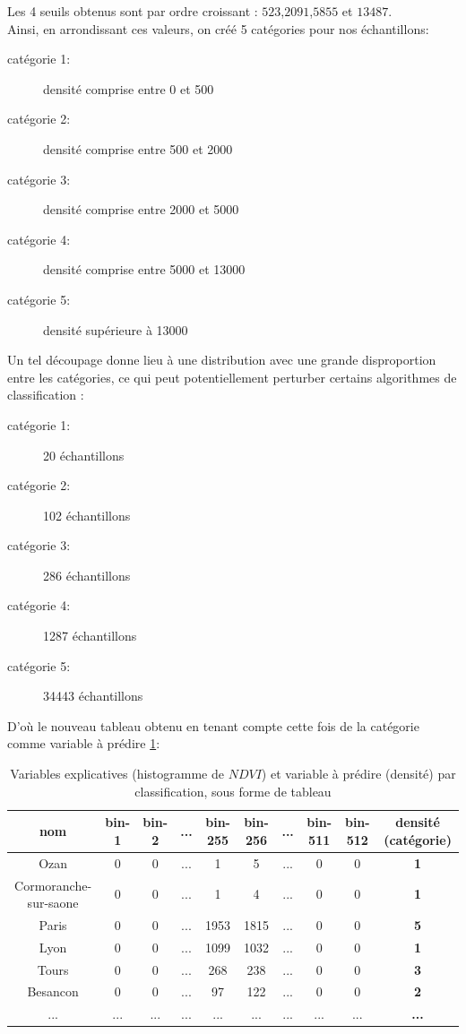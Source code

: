 \documentclass{book}
\begin{document}
Les 4 seuils obtenus sont par ordre croissant : $523$,$2091$,$5855$ et $13487$.\\
Ainsi, en arrondissant ces valeurs, on créé 5 catégories pour nos échantillons:\\
\begin{description}
 \item[catégorie 1:] densité comprise entre 0 et 500
 \item[catégorie 2:] densité comprise entre 500 et 2000
 \item[catégorie 3:] densité comprise entre 2000 et 5000
 \item[catégorie 4:] densité comprise entre 5000 et 13000
 \item[catégorie 5:] densité supérieure à 13000 
\end{description}
\clearpage

Un tel découpage donne lieu à une distribution avec une grande disproportion entre les catégories, ce qui peut potentiellement perturber certains algorithmes de classification :\\
\begin{description}
 \item[catégorie 1:] 20 échantillons
 \item[catégorie 2:] 102 échantillons
 \item[catégorie 3:] 286 échantillons
 \item[catégorie 4:] 1287 échantillons
 \item[catégorie 5:] 34443 échantillons
\end{description}

D'où le nouveau tableau obtenu en tenant compte cette fois de la catégorie comme variable à prédire \ref{data_class}:\\
\begin{table}[H]
\begin{center}
\begin{adjustbox}{max width=\textwidth}
\begin{tabular}{|c|c|c|c|c|c|c|c|c|>{\bfseries}c|}
\hline 
nom &  bin-1 & bin-2 & ... & bin-255 & bin-256 &... & bin-511 & bin-512 & densité (catégorie) \\
\hline 
Ozan & 0 & 0 & ... & 1 & 5 & ... & 0 & 0 & 1\\
\hline 
Cormoranche-sur-saone & 0 & 0 & ... & 1 & 4 & ... & 0 & 0 & 1\\
\hline 
Paris & 0 & 0 & ... & 1953 & 1815 & ... & 0 & 0 & 5\\
\hline
Lyon & 0 & 0 & ... & 1099 & 1032 & ... & 0 & 0 & 1\\
\hline
Tours & 0 & 0 & ... & 268 & 238 & ... & 0 & 0 & 3\\
\hline
Besancon & 0 & 0 & ... & 97 & 122 & ... & 0 & 0 & 2\\
\hline 
... & ... & ... & ... & ... & ... & ... & ... & ... & ... \\
\hline
\end{tabular}
\end{adjustbox}
\end{center}
\caption{Variables explicatives (histogramme de $NDVI$) et variable à prédire (densité) par classification, sous forme de tableau}
\label{data_class}
\end{table}
\end{document}
